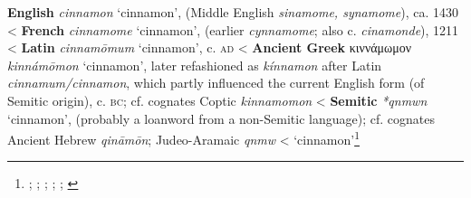 \begin{etymology}\label{ety:cinnamon}
\textbf{English} \textit{cinnamon} `cinnamon', (Middle English \textit{sinamome, synamome}), ca. 1430
< \textbf{French} \textit{cinnamome} `cinnamon', (earlier \textit{cynnamome}; also  c. \textit{cinamonde}), 1211
< \textbf{Latin} \textit{cinnamōmum} `cinnamon',  c. \textsc{ad}
< \textbf{Ancient Greek} {κιννάμωμον} \textit{kinnámōmon} `cinnamon', later refashioned as \textit{kínnamon} after Latin \textit{cinnamum/cinnamon}, which partly influenced the current English form (of Semitic origin),  c. \textsc{bc}; cf. cognates Coptic  \textit{kinnamomon}
< \textbf{Semitic} \textit{*qnmwn} `cinnamon', (probably a loanword from a non-Semitic language); cf. cognates Ancient Hebrew  \textit{qināmōn}; Judeo-Aramaic  \textit{qnmw}
< `cinnamon'\footnote{\textcite[s.v. cinnamon]{oed}; \textcite{tlfi}; \textcite{lewis_latin_1879}; \textcite[701]{beekes_etymological_2010}; \textcite[585]{klein_comprehensive_1987}; \textcite{rosol_early_2018}}
\end{etymology}